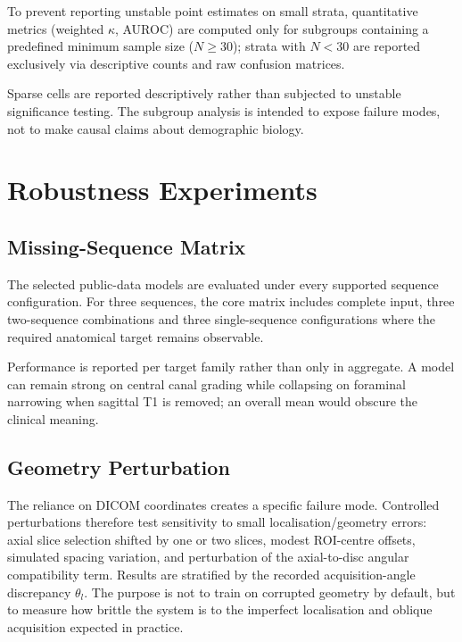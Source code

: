 To prevent reporting unstable point estimates on small strata, quantitative
metrics (weighted $\kappa$, AUROC) are computed only for subgroups containing
a predefined minimum sample size ($N \ge 30$); strata with $N < 30$ are
reported exclusively via descriptive counts and raw confusion matrices.

Sparse cells are reported descriptively rather than subjected to unstable
significance testing. The subgroup analysis is intended to expose failure modes,
not to make causal claims about demographic biology.

\section{Robustness Experiments}
\label{sec:method-robustness}

\subsection{Missing-Sequence Matrix}
\label{sec:method-missing-matrix}

The selected public-data models are evaluated under every supported sequence
configuration. For three sequences, the core matrix includes complete input,
three two-sequence combinations and three single-sequence configurations where
the required anatomical target remains observable.

Performance is reported per target family rather than only in aggregate. A
model can remain strong on central canal grading while collapsing on foraminal
narrowing when sagittal T1 is removed; an overall mean would obscure the
clinical meaning.

\subsection{Geometry Perturbation}
\label{sec:method-geometry-robust}

The reliance on DICOM coordinates creates a specific failure mode. Controlled
perturbations therefore test sensitivity to small localisation/geometry errors:
axial slice selection shifted by one or two slices, modest ROI-centre offsets,
simulated spacing variation, and perturbation of the axial-to-disc angular
compatibility term. Results are stratified by the recorded acquisition-angle
discrepancy $\theta_l$. The purpose is not to train on corrupted geometry by
default, but to measure how brittle the system is to the imperfect localisation
and oblique acquisition expected in practice.

